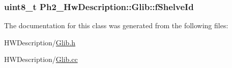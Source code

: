 \hypertarget{class_ph2___hw_description_1_1_glib_abcaa5b1cb716d3aa814688dd5691a421}{
\subsubsection[{f\-Shelve\-Id}]{\setlength{\rightskip}{0pt plus 5cm}uint8\-\_\-t Ph2\-\_\-\-Hw\-Description\-::\-Glib\-::f\-Shelve\-Id\hspace{0.3cm}{\ttfamily [protected]}}}\label{class_ph2___hw_description_1_1_glib_abcaa5b1cb716d3aa814688dd5691a421}


The documentation for this class was generated from the following files\-:\begin{DoxyCompactItemize}
\item 
H\-W\-Description/\hyperlink{_glib_8h}{Glib.\-h}\item 
H\-W\-Description/\hyperlink{_glib_8cc}{Glib.\-cc}\end{DoxyCompactItemize}
